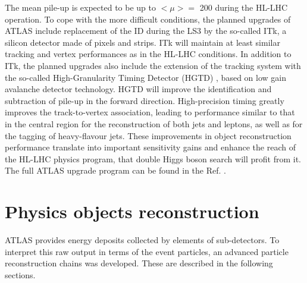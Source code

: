 The mean pile-up is expected to be up to  $<\mu> = $ 200 during the HL-LHC operation. To cope with the more difficult conditions, the planned upgrades of ATLAS include replacement of the ID during the LS3 by the so-called ITk, a silicon detector made of pixels and strips. ITk will maintain at least similar tracking and vertex performances as in the HL-LHC conditions. In addition to ITk, the planned upgrades also include the extension of the tracking system with the so-called High-Granularity Timing Detector (HGTD) \cite{HGTD}, based on low gain avalanche detector technology. HGTD will improve the identification and subtraction of pile-up in the forward direction. High-precision timing greatly improves the track-to-vertex association, leading to performance similar to that in the central region for the reconstruction of both jets and leptons, as well as for the tagging of heavy-flavour jets. These improvements in object reconstruction performance translate into important sensitivity gains and enhance the reach of the HL-LHC physics program, that double Higgs boson search will profit from it. The full ATLAS upgrade program can be found in the Ref. \cite{CERN-LHCC-2015-020, CERN-LHCC-2017-021, CERN-LHCC-2017-020, CERN-LHCC-2017-005, CERN-LHCC-2017-017, CERN-LHCC-2017-018, CERN-LHCC-2017-019}.
\section{Physics objects reconstruction}
\label{chap2:Objects}
ATLAS provides energy deposits collected by elements of sub-detectors. To interpret this raw output in terms of the event particles, an advanced particle reconstruction chains was developed. These are described in the following sections.

